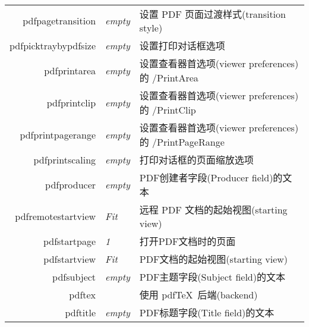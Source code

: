 \documentclass{article}
\begin{document}
\begin{longtable}{@{}>{\ttfamily}rlp{7cm}@{}}
  pdfpagetransition                 & \textit{empty}         & 设置 PDF 页面过渡样式(transition style)                                                                 \\
  pdfpicktraybypdfsize
                                    & \textit{empty}         & 设置打印对话框选项                                                                                       \\
  pdfprintarea                      & \textit{empty}         & 设置查看器首选项(viewer preferences)的 /PrintArea                                                        \\
  pdfprintclip                      & \textit{empty}         & 设置查看器首选项(viewer preferences)的 /PrintClip                                                        \\
  pdfprintpagerange                 & \textit{empty}         & 设置查看器首选项(viewer preferences)的 /PrintPageRange                                                   \\
  pdfprintscaling                   & \textit{empty}         & 打印对话框的页面缩放选项                                                                                    \\
  pdfproducer                       & \textit{empty}         & PDF创建者字段(Producer field)的文本                                                                     \\
  pdfremotestartview                & \textit{Fit}           & 远程 PDF 文档的起始视图(starting view)                                                                   \\
  pdfstartpage                      & \textit{1}             & 打开PDF文档时的页面                                                                                     \\
  pdfstartview                      & \textit{Fit}           & PDF文档的起始视图(starting view)                                                                       \\
  pdfsubject                        & \textit{empty}         & PDF主题字段(Subject field)的文本                                                                       \\
  pdftex                            &                        & 使用 \textsf{pdf\TeX}\ 后端(backend)                                                                \\
  pdftitle                          & \textit{empty}         & PDF标题字段(Title field)的文本                                                                         \\

\end{longtable}
\end{document}
